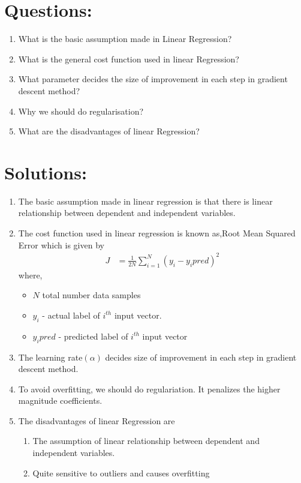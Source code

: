 \documentclass[journal,12pt,onecolumn]{IEEEtran}
\providecommand{\brak}[1]{\ensuremath{\left(#1\right)}}
\theoremstyle{remark}
\numberwithin{equation}{section}
\begin{document}
 \section{Questions:}
   \begin{enumerate}
     \item What is the basic assumption made in Linear Regression?
     \item What is the general cost function used in linear Regression?
     \item What parameter decides the size of improvement in each step in gradient descent method?
     \item Why we should do regularisation?
     \item What are the disadvantages of linear Regression?	
    \end{enumerate}
 \section{Solutions:}
   \begin{enumerate}
    \item The basic assumption made in linear regression is that there is linear relationship between dependent and independent variables. 
    \item The cost function used in linear regression is known as,Root Mean Squared Error which is given by
	     \begin{align}
		     J &= \frac{1}{2N}\sum_{i=1}^{N}\brak{y_{i}-y_ipred}^{2}
             \end{align}
		   where,
		   \begin{itemize}
		    \item $N$ total number data samples
		    \item $y_{i}$ - actual label of $i^{th}$ input vector.
		    \item $y_{i}pred$ - predicted label of $i^{th}$ input vector
	           \end{itemize}
    \item The learning rate$\brak{\alpha}$ decides size of improvement in each step in gradient descent method.
    \item To avoid overfitting, we should do regulariation. It penalizes the higher magnitude coefficients.
    \item The disadvantages of linear Regression are
	    \begin{enumerate}
	      \item The assumption of linear relationship between dependent and independent variables.
	      \item Quite sensitive to outliers and causes overfitting
	    \end{enumerate}
    \end{enumerate}
\end{document}
